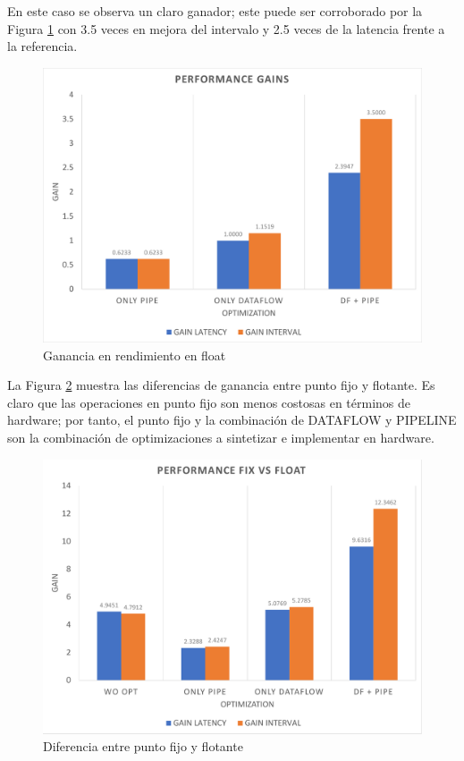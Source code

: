 En este caso se observa un claro ganador; este puede ser corroborado por la Figura \ref{fig:perfGainFix} con 3.5 veces en mejora del intervalo y 2.5 veces de la latencia frente a la referencia.

\begin{figure}[!ht]
	\centering
		\includegraphics[scale=0.45]{Figures/PERFGAINFIX}
	\caption{Ganancia en rendimiento en float}
	\label{fig:perfGainFix}
\end{figure}

La Figura \ref{fig:fixfloat} muestra las diferencias de ganancia entre punto fijo y flotante. Es claro que las operaciones en punto fijo son menos costosas en términos de hardware; por tanto, el punto fijo y la combinación de DATAFLOW y PIPELINE son la combinación de optimizaciones a sintetizar e implementar en hardware.

\begin{figure}[!ht]
	\centering
		\includegraphics[scale=0.45]{Figures/fixfloat}
	\caption{Diferencia entre punto fijo y flotante}
	\label{fig:fixfloat}
\end{figure}

